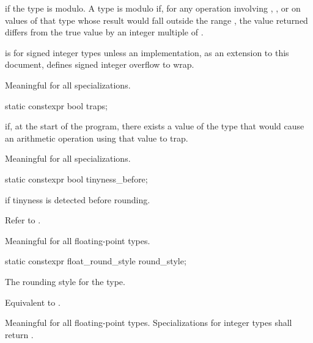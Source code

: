 \begin{itemdescr}
\pnum
{} if the type is modulo.
A type is modulo if, for any operation involving \tcode{+}, \tcode{-}, or
\tcode{*} on values of that type whose result would fall outside the range
, the value returned differs from the true value by an
integer multiple of .

\pnum
\begin{example}
 is  for signed integer types
unless an implementation, as an extension to this document,
defines signed integer overflow to wrap.
\end{example}

\pnum
Meaningful for all specializations.
\end{itemdescr}

%
\begin{itemdecl}
static constexpr bool traps;
\end{itemdecl}

\begin{itemdescr}
\pnum
{}
if, at the start of the program, there exists a value of the type that would cause
an arithmetic operation using that value to trap.

\pnum
Meaningful for all specializations.
\end{itemdescr}

%
\begin{itemdecl}
static constexpr bool tinyness_before;
\end{itemdecl}

\begin{itemdescr}
\pnum
{}
if tinyness is detected before rounding.
\begin{footnote}
Refer to
\IsoFloatUndated{}.
\end{footnote}

\pnum
Meaningful for all floating-point types.
\end{itemdescr}

%
\begin{itemdecl}
static constexpr float_round_style round_style;
\end{itemdecl}

\begin{itemdescr}
\pnum
The rounding style for the type.
\begin{footnote}
Equivalent to .
\end{footnote}

\pnum
Meaningful for all floating-point types.
Specializations for integer types shall return
.
\end{itemdescr}

